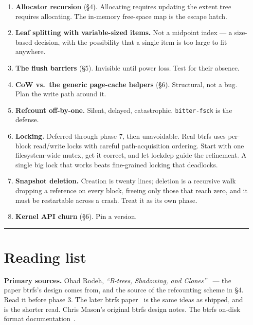 \begin{enumerate}
\def\labelenumi{\arabic{enumi}.}
\tightlist
\item
  \textbf{Allocator recursion} (§4). Allocating requires updating the extent tree requires
  allocating. The in-memory free-space map is the escape hatch.
\item
  \textbf{Leaf splitting with variable-sized items.} Not a midpoint index --- a size-based
  decision, with the possibility that a single item is too large to fit anywhere.
\item
  \textbf{The flush barriers} (§5). Invisible until power loss. Test for their absence.
\item
  \textbf{CoW vs.~the generic page-cache helpers} (§6). Structural, not a bug. Plan the write
  path around it.
\item
  \textbf{Refcount off-by-one.} Silent, delayed, catastrophic. \texttt{bitter-fsck} is the defense.
\item
  \textbf{Locking.} Deferred through phase 7, then unavoidable. Real btrfs uses per-block
  read/write locks with careful path-acquisition ordering. Start with one filesystem-wide
  mutex, get it correct, and let lockdep guide the refinement. A single big lock that
  works beats fine-grained locking that deadlocks.
\item
  \textbf{Snapshot deletion.} Creation is twenty lines; deletion is a recursive walk dropping
  a reference on every block, freeing only those that reach zero, and it must be
  restartable across a crash. Treat it as its own phase.
\item
  \textbf{Kernel API churn} (§6). Pin a version.
\end{enumerate}

\begin{center}\rule{0.5\linewidth}{0.5pt}\end{center}

\hypertarget{reading-list}{%
\section{Reading list}\label{reading-list}}

\textbf{Primary sources.} Ohad Rodeh, \emph{``B-trees, Shadowing, and Clones''}~\cite{Rodeh_2008}
--- the paper btrfs's design comes from, and the source of the refcounting scheme in §4. Read it
before phase 3. The later btrfs paper~\cite{Rodeh_2013} is the same ideas as shipped, and is the
shorter read. Chris Mason's original btrfs design notes. The btrfs on-disk format
documentation~\cite{btrfs_docs}.

